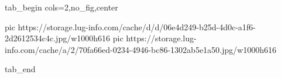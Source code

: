  
 
 
 
 


\ifcmt
  tab_begin cols=2,no_fig,center

     pic https://storage.lug-info.com/cache/d/d/06e4d249-b25d-4d0c-a1f6-2d2612534c4c.jpg/w1000h616%
		 pic https://storage.lug-info.com/cache/a/2/70fa66ed-0234-4946-bc86-1302ab5e1a50.jpg/w1000h616%

  tab_end
\fi
